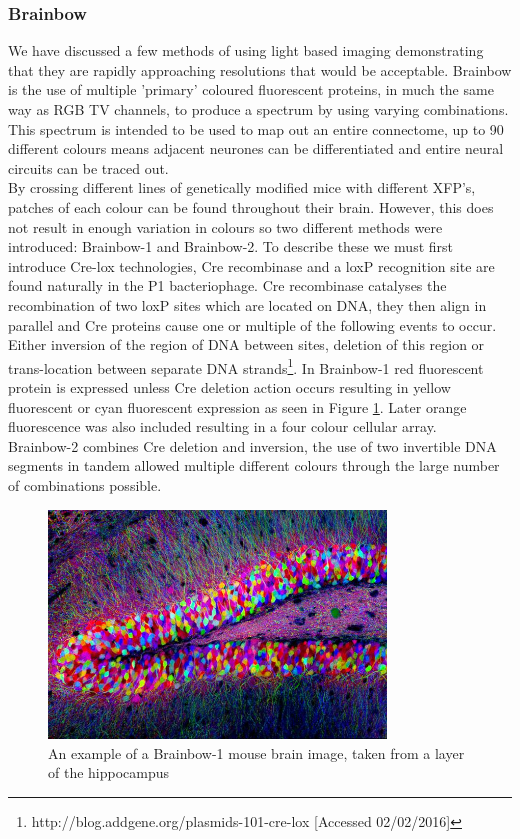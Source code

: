\documentclass[a4paper, 11pt]{article}
\numberwithin{equation}{section}
\begin{document}
\subsubsection{Brainbow}
We have discussed a few methods of using light based imaging demonstrating that they are rapidly approaching resolutions that would be acceptable. Brainbow is the use of multiple 'primary' coloured fluorescent proteins, in much the same way as RGB TV channels, to produce a spectrum by using varying combinations. This spectrum is intended to be used to map out an entire connectome, up to 90 different colours means adjacent neurones can be differentiated and entire neural circuits can be traced out.\\
By crossing different lines of genetically modified mice with different XFP's, patches of each colour can be found throughout their brain. However, this does not result in enough variation in colours so two different methods were introduced: Brainbow-1 and Brainbow-2. To describe these we must first introduce Cre-lox technologies, Cre recombinase and a loxP recognition site are found naturally in the P1 bacteriophage. Cre recombinase catalyses the recombination of two loxP sites which are located on DNA, they then align in parallel and Cre proteins cause one or multiple of the following events to occur. Either inversion of the region of DNA between sites, deletion of this region or trans-location between separate DNA strands\footnote{http://blog.addgene.org/plasmids-101-cre-lox [Accessed 02/02/2016]}. In Brainbow-1 red fluorescent protein is expressed unless Cre deletion action occurs resulting in yellow fluorescent or cyan fluorescent expression as seen in Figure \ref{Brainbowpic}. Later orange fluorescence was also included resulting in a four colour cellular array. \cite{Livet2007}\\
Brainbow-2 combines Cre deletion and inversion, the use of two invertible DNA segments in tandem allowed multiple different colours through the large number of combinations possible\cite{Livet2007}. 
\begin{figure}[h]
	\centering
	
	\includegraphics[width=0.8\textwidth]{Brainbow.jpg}
	\caption[An example of a Brainbow-1 mouse brain image, taken from a layer of the hippocampus]{\centering \label{Brainbowpic}An example of a Brainbow-1 mouse brain image, taken from a layer of the hippocampus\footnotemark}
	
\end{figure}
\end{document}
